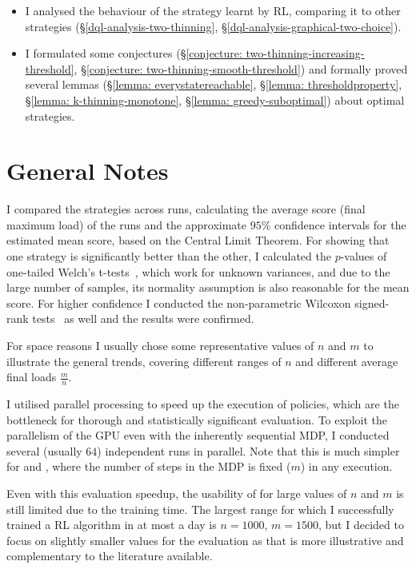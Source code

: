 \begin{itemize}
    \item 
    I analysed the behaviour of the strategy learnt by RL, comparing it to other strategies (\S\ref{dql-analysis-two-thinning}, \S\ref{dql-analysis-graphical-two-choice}).
    \item
    I formulated some conjectures (\S\ref{conjecture: two-thinning-increasing-threshold}, \S\ref{conjecture: two-thinning-smooth-threshold}) and formally proved several lemmas (\S\ref{lemma: everystatereachable}, \S\ref{lemma: thresholdproperty}, \S\ref{lemma: k-thinning-monotone}, \S\ref{lemma: greedy-suboptimal}) about optimal strategies.
\end{itemize}


\section{General Notes} \label{evaluationnotes}

I compared the strategies across \NumberofRuns runs, calculating the average score (final maximum load) of the runs and the approximate $95\%$ confidence intervals for the estimated mean score, based on the Central Limit Theorem. For showing that one strategy is significantly better than the other, I calculated the $p$-values of one-tailed Welch's t-tests~\cite{welch1947ttest}, which work for unknown variances, and due to the large number of samples, its normality assumption is also reasonable for the mean score. For higher confidence I conducted the non-parametric Wilcoxon signed-rank tests~\cite{wilcoxon1992test} as well and the results were confirmed.


For space reasons I usually chose some representative values of $n$ and $m$ to illustrate the general trends, covering different ranges of $n$ and different average final loads $\frac{m}{n}$.


I utilised parallel processing to speed up the execution of \DQL policies, which are the bottleneck for thorough and statistically significant evaluation. To exploit the parallelism of the GPU even with the inherently sequential MDP, I conducted several (usually $64$) independent runs in parallel. Note that this is much simpler for \TwoThinning and \GraphicalTwoChoice, where the number of steps in the MDP is fixed ($m$) in any execution.


Even with this evaluation speedup, the usability of \DQL for large values of $n$ and $m$ is still limited due to the training time. The largest range for which I successfully trained a RL algorithm in at most a day is $n=1000$, $m=1500$, but I decided to focus on slightly smaller values for the evaluation as that is more illustrative and complementary to the literature available.  


